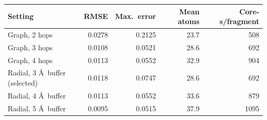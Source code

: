 \begin{tabular}{lrrrr}
\toprule
Setting & RMSE & Max.\ error & Mean atoms & Core-s/fragment \\
\midrule
Graph, 2 hops & 0.0278 & 0.2125 & 23.7 & 508 \\
Graph, 3 hops & 0.0108 & 0.0521 & 28.6 & 692 \\
Graph, 4 hops & 0.0113 & 0.0552 & 32.9 & 904 \\
Radial, 3 \AA\ buffer (selected) & 0.0118 & 0.0747 & 28.6 & 692 \\
Radial, 4 \AA\ buffer & 0.0113 & 0.0552 & 33.6 & 879 \\
Radial, 5 \AA\ buffer & 0.0095 & 0.0515 & 37.9 & 1095 \\
\bottomrule
\end{tabular}
